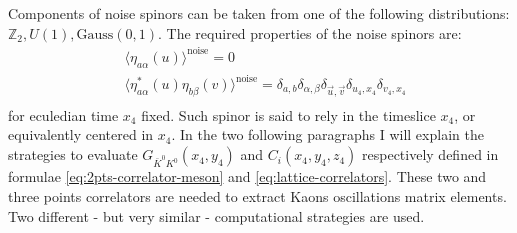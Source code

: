 \documentclass[english, LaM, oneside, noexaminfo]{sapthesis}
\begin{document}
Components of noise spinors can be taken from one of the following distributions: $\mathbb{Z}_2, U(1), \text{Gauss}(0,1)$.
The required properties of the noise spinors are:
\begin{equation}\label{eq:eta-properties}
    \begin{split}
        & \langle \eta_{a\alpha} (u) \rangle^{\text{noise}} = 0 \\
        & \langle \eta^{*}_{a\alpha} (u) \eta_{b\beta} (v) \rangle^{\text{noise}} = \delta_{a,b} \delta_{\alpha,\beta} \delta_{\vec u, \vec v} \delta_{u_4,x_4} \delta_{v_4,x_4} \\
    \end{split}
\end{equation}
for eculedian time $x_4$ fixed.
Such spinor is said to rely in the timeslice $x_4$, or equivalently centered in $x_4$.
\newline
In the two following paragraphs I will explain the strategies to evaluate $G_{\bar K^0 K^0}(x_4,y_4)$ and $C_i(x_4,y_4,z_4)$ respectively defined in formulae \ref{eq:2pts-correlator-meson} and \ref{eq:lattice-correlators}.
These two and three points correlators are needed to extract Kaons oscillations matrix elements.
Two different - but very similar - computational strategies are used.
\end{document}
